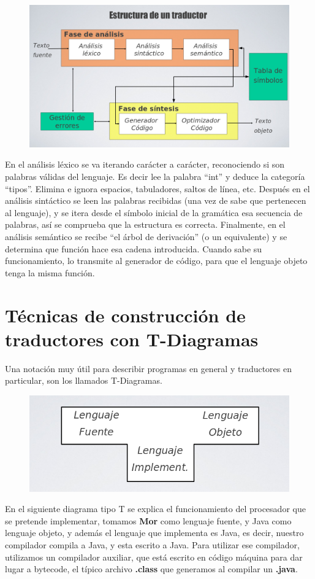 \begin{figure}[h]
	\centering
	\includegraphics[width=0.7\linewidth]{img/4}
	\caption{}
	\label{fig:4}
\end{figure}

En el análisis léxico se va iterando carácter a carácter, reconociendo si son palabras válidas del lenguaje. Es decir lee
la palabra “int” y deduce la categoría “tipos”. Elimina e ignora espacios, tabuladores, saltos de línea, etc. Después en
el análisis sintáctico se leen las palabras recibidas (una vez de sabe que pertenecen al lenguaje), y se itera desde el
símbolo inicial de la gramática esa secuencia de palabras, así se comprueba que la estructura es correcta. Finalmente,
en el análisis semántico se recibe “el árbol de derivación” (o un equivalente) y se determina que función hace esa
cadena introducida. Cuando sabe su funcionamiento, lo transmite al generador de código, para que el lenguaje objeto
tenga la misma función.

\section{Técnicas de construcción de traductores con T-Diagramas}
Una notación muy útil para describir programas en general y traductores en particular, son los llamados T-Diagramas.
\begin{figure}[h]
	\centering
	\includegraphics[width=0.7\linewidth]{img/5}
	\caption{}
	\label{fig:5}
\end{figure}


En el siguiente diagrama tipo T se explica el funcionamiento del procesador que se pretende implementar, tomamos \textbf{ Mor } como lenguaje fuente, y Java como lenguaje objeto, y además el lenguaje que implementa es Java, es decir, nuestro compilador compila a Java, y esta escrito a Java. 
\newline
\newline
Para utilizar ese compilador, utilizamos un compilador auxiliar, que está escrito en código máquina para dar lugar a bytecode, el típico archivo \textbf{.class} que generamos al compilar un \textbf{.java}.
\newline

